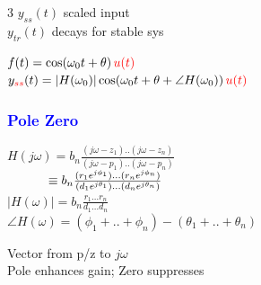 \documentclass[4pt]{article}
\theoremstyle{definition}
\theoremstyle{definition}
\renewcommand{\o}{\omega}
\newcommand{\red}[1]{\textcolor{red}{#1}}
\newcommand{\blue}[1]{\textcolor{blue}{#1}}
\begin{document}
\begin{landscape}
\begin{multicols}{3}
    $y_{ss}(t)$ scaled input\\
    $y_{tr}(t)$ decays for stable sys

    \(f(t) = \cos(\o_0 t + \theta) \, \red{u(t)}\)\\
    \(y_{\red{ss}}(t) = |H(\o_0)| \cos(\o_0 t + \theta + \angle H(\o_0)) \, \red{u(t)}\)

\subsubsection*{\blue{Pole Zero}}
    \(H(j\o) = b_n \frac{(j\o-z_1)..(j\o-z_n)}{(j\o-p_1)..(j\o-p_n)}\)\\\
    \(\hspace{2.75em} \equiv b_n \frac{(r_1 e^{j\phi_1})...(r_n e^{j\phi_n})}{(d_1 e^{j\theta_1})... (d_n e^{j\theta_n})}\)\\
    \(|H(\o)| = b_n \frac{r_1 ... r_n}{d_1 ... d_n}\)\\
    \(\angle H(\o) = (\phi_1 + .. + \phi_n) - (\theta_1 + .. + \theta_n)\)          %

    Vector from p/z to $j\o$\\
    Pole enhances gain; Zero suppresses
\end{multicols}
\end{landscape}
\end{document}
